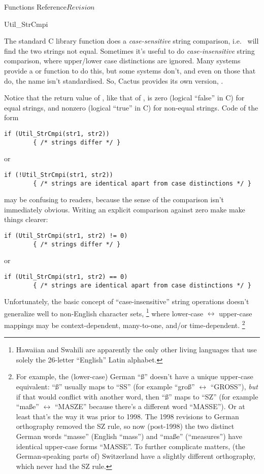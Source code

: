 \begin{cactuspart}{ Functions Reference}{}{$Revision$}
\begin{FunctionDescription}{Util\_StrCmpi}
\begin{Discussion}
The standard C library  function does a {\em case-sensitive\/}
string comparison, i.e.\  will find the
two strings not equal.  Sometimes it's useful to do {\em case-insensitive\/}
string comparison, where upper/lower case distinctions are ignored.
Many systems provide a  or 
function to do this, but some systems don't, and even on those that do,
the name isn't standardised.  So, Cactus provides its own version,
.

Notice that the return value of , like that of
, is zero (logical ``false'' in C) for equal strings,
and nonzero (logical ``true'' in C) for non-equal strings.
Code of the form
\begin{verbatim}
if (Util_StrCmpi(str1, str2))
        { /* strings differ */ }
\end{verbatim}
or
\begin{verbatim}
if (!Util_StrCmpi(str1, str2))
        { /* strings are identical apart from case distinctions */ }
\end{verbatim}
may be confusing to readers, because the sense of the comparison
isn't immediately obvious.  Writing an explicit comparison against zero
make make things clearer:
\begin{verbatim}
if (Util_StrCmpi(str1, str2) != 0)
        { /* strings differ */ }
\end{verbatim}
or
\begin{verbatim}
if (Util_StrCmpi(str1, str2) == 0)
        { /* strings are identical apart from case distinctions */ }
\end{verbatim}

Unfortunately, the basic concept of ``case-insensitive'' string
operations doesn't generalize well to non-English character sets,%
\footnote{%
	 Hawaiian and Swahili are apparently the only
	 other living languages that use solely the
	 26-letter ``English'' Latin alphabet.
	 }%
{} where lower-case $\leftrightarrow$ upper-case mappings may be
context-dependent, many-to-one, and/or time-dependent.%
\footnote{%
	 For example, the (lower-case) German ``\ss''
	 doesn't have a unique upper-case equivalent:
	 ``\ss'' usually maps to ``SS''
	 (for example ``gro\ss'' $\leftrightarrow$ ``GROSS''),
	 {\em but\/} if that would conflict
	 with another word, then ``\ss'' maps to ``SZ''
	 (for example ``ma\ss{}e'' $\leftrightarrow$ ``MASZE''
	 because there's a different word ``MASSE'').
	 Or at least that's the way it was prior to 1998.
	 The 1998 revisions to German orthography
	 removed the SZ rule, so now (post-1998) the two
	 distinct German words ``masse'' (English ``mass'')
	 and ``ma\ss{}e'' (``measures'') have identical
	 upper-case forms ``MASSE''.  To further complicate
	 matters, (the German-speaking parts of) Switzerland
	 have a slightly different orthography, which never
	 had the SZ rule.

}
\end{Discussion}
\end{FunctionDescription}
\end{cactuspart}
